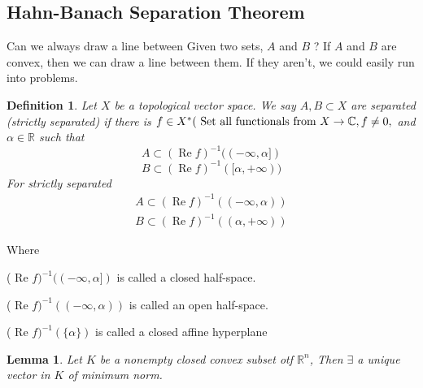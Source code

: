 \documentclass[oneside]{book}
\newtheorem{lemma}[theorem]{Lemma}
\newtheorem{mydef}{Definition}
\begin{document}
\subsection{Hahn-Banach Separation Theorem}
\label{ss:11}
 Can we always draw a line between Given two sets, $ A$ and $ B$ ?
  If $ A$ and $ B$ are convex, then we can draw a line between them. If they aren't, we could easily run into problems.









\begin{mydef} 
Let $X$ be a topological vector space. We say $A, B \subset X$ are separated (strictly separated) if there is $f \in X^{*}(\text{ Set  all functionals from } \newline
 X \rightarrow \mathbb{C}, f \neq 0,$ and $\alpha \in \mathbb{R}$ such that
\[
A \subset(\operatorname{Re} f)^{-1}((-\infty, \alpha])
\]
\[
B \subset(\operatorname{Re} f)^{-1}([\alpha,+\infty))
\]
For strictly separated
\[
\begin{array}{l}
A \subset(\operatorname{Re} f)^{-1}((-\infty, \alpha)) \\
B \subset(\operatorname{Re} f)^{-1}((\alpha,+\infty))
\end{array}
\]
\end{mydef}

Where 
\hfill \ \break

\quad \quad \quad \quad \quad 
 ( Re $f)^{-1}((-\infty, \alpha])$ is called a closed half-space.
\newline

 \quad \quad \quad \quad \quad ( Re $f)^{-1}((-\infty, \alpha))$ is called an open half-space.
\newline

\quad \quad \quad \quad \quad ( Re $f)^{-1}(\{\alpha\})$ is called a closed affine hyperplane







\begin{lemma}
Let $K$ be a nonempty closed convex subset otf $\mathbb{R}^{n}$, Then $\exists $ a  unique vector in $K$  of minimum norm.
\end{lemma}
\end{document}
